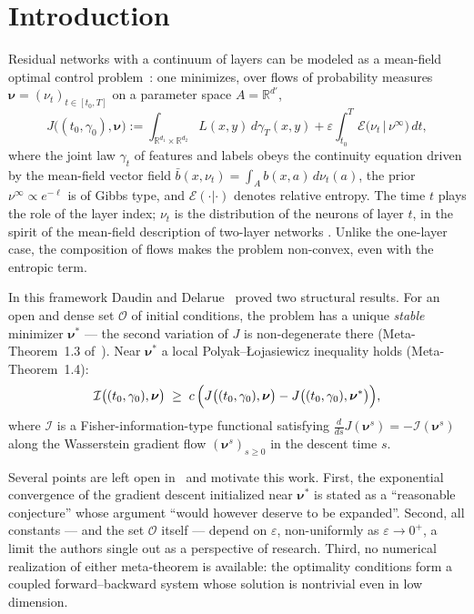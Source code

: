 \documentclass[11pt,leqno]{amsart}
\newcommand{\R}{\mathbb{R}}
\newcommand{\cI}{\mathcal{I}}
\newcommand{\cO}{\mathcal{O}}
\newcommand{\cE}{\mathcal{E}}
\newcommand{\bnu}{\boldsymbol{\nu}}
\newcommand{\eps}{\varepsilon}
\newcommand{\dd}{\,d}
\numberwithin{equation}{section}
\theoremstyle{definition}
\begin{document}
\maketitle

\section{Introduction}
\label{sec:intro}

Residual networks with a continuum of layers can be modeled as a mean-field
optimal control problem~\cite{E2017,HaberRuthotto,EHanLi2019}: one minimizes,
over flows of probability measures $\bnu=(\nu_t)_{t\in[t_0,T]}$ on a parameter
space $A=\R^{d'}$,
\begin{equation}
\label{eq:J}
J\bigl((t_0,\gamma_0),\bnu\bigr)
 := \int_{\R^{d_1}\times\R^{d_2}} L(x,y)\dd\gamma_T(x,y)
 + \eps\int_{t_0}^T \cE\bigl(\nu_t\,\big|\,\nu^\infty\bigr)\dd t ,
\end{equation}
where the joint law $\gamma_t$ of features and labels obeys the continuity
equation driven by the mean-field vector field
$\bar b(x,\nu_t)=\int_A b(x,a)\dd\nu_t(a)$, the prior
$\nu^\infty\propto e^{-\ell}$ is of Gibbs type, and
$\cE(\cdot|\cdot)$ denotes relative entropy.  The time $t$ plays the role of
the layer index; $\nu_t$ is the distribution of the neurons of layer $t$, in
the spirit of the mean-field description of two-layer networks
\cite{meiMontanariNguyen2018MFNN,BachChizat,RotskoffVanDenEijnden}.
Unlike the one-layer case, the composition of flows makes the problem
non-convex, even with the entropic term.

In this framework Daudin and Delarue~\cite{DaudinDelarue2025} proved two
structural results.  For an open and dense set $\cO$ of initial conditions,
the problem has a unique \emph{stable} minimizer $\bnu^*$ --- the second
variation of $J$ is non-degenerate there
(Meta-Theorem~1.3 of~\cite{DaudinDelarue2025}).  Near $\bnu^*$ a local
Polyak--\L ojasiewicz inequality holds (Meta-Theorem~1.4):
\begin{equation}
\label{eq:PL}
\cI\bigl((t_0,\gamma_0),\bnu\bigr)\;\ge\;
c\,\Bigl(J\bigl((t_0,\gamma_0),\bnu\bigr)-J\bigl((t_0,\gamma_0),\bnu^*\bigr)\Bigr),
\end{equation}
where $\cI$ is a Fisher-information-type functional satisfying
$\frac{d}{ds}J(\bnu^s)=-\cI(\bnu^s)$ along the Wasserstein gradient flow
$(\bnu^s)_{s\ge0}$ in the descent time $s$.

Several points are left open in~\cite{DaudinDelarue2025} and motivate this
work.  First, the exponential convergence of the gradient descent
initialized near $\bnu^*$ is stated as a ``reasonable conjecture'' whose
argument ``would however deserve to be expanded''.  Second, all constants
--- and the set $\cO$ itself --- depend on $\eps$, non-uniformly as
$\eps\to0^+$, a limit the authors single out as a perspective of research.
Third, no numerical realization of either meta-theorem is available: the
optimality conditions form a coupled forward--backward system whose solution
is nontrivial even in low dimension.
\end{document}
